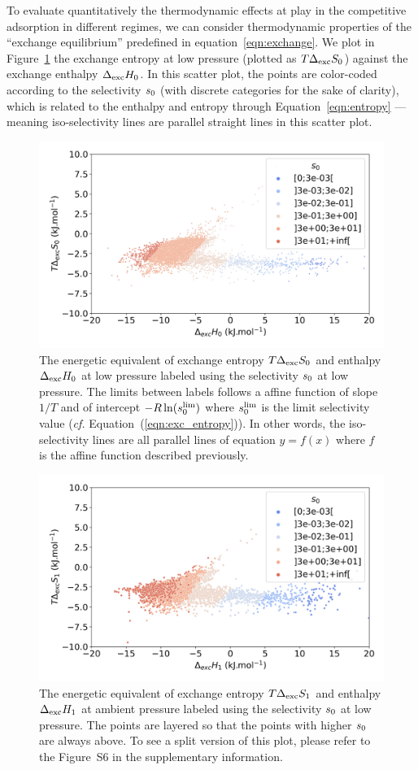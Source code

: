 \documentclass[main.tex]{subfiles}
\begin{document}
To evaluate quantitatively the thermodynamic effects at play in the competitive adsorption in different regimes, we can consider thermodynamic properties of the ``exchange equilibrium'' predefined in equation~\ref{eqn:exchange}. We plot in Figure~\ref{fgr:HSplot_0} the exchange entropy at low pressure (plotted as $T\Delta_{\text{exc}}S_{\text{0}}$) against the exchange enthalpy $\Delta_{\text{exc}}H_{\text{0}}$. In this scatter plot, the points are color-coded according to the selectivity $s_{\text{0}}$ (with discrete categories for the sake of clarity), which is related to the enthalpy and entropy through Equation~\ref{eqn:entropy} --- meaning iso-selectivity lines are parallel straight lines in this scatter plot.
  
  \begin{figure}[t]
  \centering
    \includegraphics[width=0.7\linewidth]{figures/2-thermo/enthalpy_entropy_0_s_0.jpg}
    \caption{The energetic equivalent of exchange entropy $T\Delta_{\text{exc}}S_{\text{0}}$ and enthalpy $\Delta_{\text{exc}}H_{\text{0}}$ at low pressure labeled using the selectivity $s_{\text{0}}$ at low pressure. The limits between labels follows a affine function of slope $1/T$ and of intercept $-R\ln(s_{\text{0}}^{\text{lim}})$ where $s_{\text{0}}^{\text{lim}}$ is the limit selectivity value (\emph{cf.} Equation~(\ref{eqn:exc_entropy})). In other words, the iso-selectivity lines are all parallel lines of equation $y=f(x)$ where $f$ is the affine function described previously.}
    \label{fgr:HSplot_0}
  \end{figure}
  
  
  \begin{figure}[t]
  \centering
    \includegraphics[width=0.7\linewidth]{figures/2-thermo/enthalpy_entropy_2080_s_0.jpg}
    \caption{The energetic equivalent of exchange entropy $T\Delta_{\text{exc}}S_{\text{1}}$ and enthalpy $\Delta_{\text{exc}}H_{\text{1}}$ at ambient pressure labeled using the selectivity $s_{\text{0}}$ at low pressure. The points are layered so that the points with higher $s_{\text{0}}$ are always above. To see a split version of this plot, please refer to the Figure~S6 in the supplementary information.}
    \label{fgr:HSplot_1}
  \end{figure}
  
\end{document}
